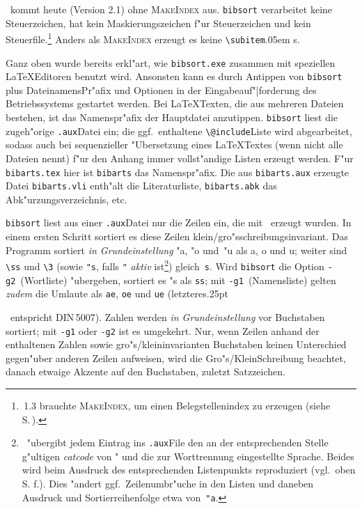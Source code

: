 \documentclass[12pt,a4paper]{article}
\newcommand{\pdfko}[1]{\kern #1pt
                          \strut\ignorespaces}%
\begin{document}
\BibArts\ kommt heute (Version 2.1) ohne \textsc{MakeIndex} aus.  
\verb|bibsort| verarbeitet keine Steuerzeichen, hat kein 
Maskierungszeichen f"ur Steuerzeichen und kein
Steuerfile.\footnote{\BibArts\,1.3 brauchte \textsc{MakeIndex}, um einen
Belegstellenindex zu erzeugen (siehe S.\,\pageref{compabil}).}
Anders als \textsc{MakeIndex} erzeugt es keine 
\verb|\subitem|\kern.05em s.\label{subitem}%

Ganz oben wurde bereits erkl"art, wie \verb|bibsort.exe| zusammen mit
speziellen \LaTeX\hy Editoren benutzt wird. Ansonsten kann es durch Antippen
von \verb|bibsort| plus Dateinamens\hy Pr"afix und Optionen in der
Eingabeauf"|forderung des Betriebssystems gestartet werden. Bei 
\LaTeX\hy Texten, die aus mehreren Dateien bestehen, ist das Namenspr"afix der Hauptdatei 
anzutippen. \verb|bibsort| liest die zugeh"orige \hspace{-.1em}\texttt{.aux}\hy Datei ein; 
die ggf.\ enthaltene \verb|\@include|\hy Liste wird abgearbeitet, sodass auch 
bei sequenzieller "Ubersetzung eines \LaTeX\hy Textes (wenn \verb||
nicht alle Dateien nennt) f"ur den \BibArts\hy Anhang immer vollst"andige Listen 
erzeugt werden. F"ur \verb|bibarts.tex| hier ist 
\verb|bibarts| das Namenspr"afix. Die aus
\verb|bibarts.aux| erzeugte Datei \verb|bibarts.vli| enth"alt die
Literaturliste, \verb|bibarts.abk| das Abk"urzungsverzeichnis, etc.

\verb|bibsort| liest aus einer \hspace{-.1em}\texttt{.aux}\hy Datei nur die Zeilen ein, die
mit \BibArts\ erzeugt wurden. In einem ersten Schritt sortiert es 
diese Zeilen klein\fhy\slash gro"s\hy schreibungs\hy invariant. Das Programm sortiert 
\textit{in Grundeinstellung} "a, "o und~"u als a, o und u; weiter sind \verb|\ss| und 
\verb|\3| (sowie \verb|"s|, falls \verb|"| \textit{aktiv} ist\footnote{\BibArts\
"ubergibt jedem Eintrag ins \hspace{-.1em}\texttt{.aux}\hy File den an der
entsprechenden Stelle g"ultigen \textit{catcode} von \string" und die
zur Worttrennung eingestellte Sprache. Beides wird beim Ausdruck
des entsprechenden Listenpunkts reproduziert (vgl.\ oben S.\,\pageref{hyphenation}\,f.).
Dies "andert ggf.\ Zeilenumbr"uche in den Listen und daneben Ausdruck und 
Sortierreihenfolge etwa von~\texttt{\string"a}.}) gleich~\verb|s|. 
Wird \texttt{bibsort} die Option \ko\verb|-g2|~(Wortliste) "ubergeben,
sortiert es "s als \verb|ss|; mit \ko\verb|-g1|~(Namensliste) 
gelten \textit{zudem} die Umlaute als \verb|ae|, \verb|oe| und \verb|ue| 
(letzteres\pdfko{.25}\ entspricht DIN\,5007\fhy 2). Zahlen werden \textit{in Grundeinstellung} 
vor Buchstaben sortiert; mit \ko\verb|-g1| oder \ko\verb|-g2| 
ist es umgekehrt. Nur, wenn Zeilen anhand der enthaltenen Zahlen sowie 
gro"s\fhy\slash klein\hy invarianten Buchstaben keinen Unterschied gegen"uber
anderen Zeilen aufweisen, wird die Gro"s\fhy\slash Klein\hy Schreibung beachtet,
danach etwaige Akzente auf den Buchstaben, zuletzt Satzzeichen.
\end{document}
